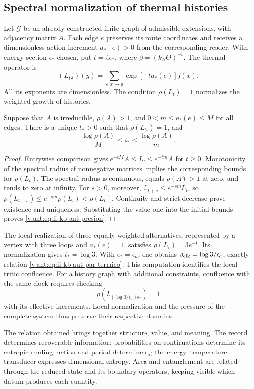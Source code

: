 \subsection{Spectral normalization of thermal histories}

Let \(\mathcal G\) be an already constructed finite graph of admissible
extensions, with adjacency matrix \(A\). Each edge \(e\) preserves
its route coordinates and receives a dimensionless action increment
\(a_*(e)>0\) from the corresponding reader. With energy section
\(\epsilon_*\) chosen, put \(t=\beta\epsilon_*\), where
\(\beta=(k_B\Theta)^{-1}\). The thermal operator is
\begin{equation}
 (L_tf)(y)=\sum_{e:x\to y}\exp[-t a_*(e)]f(x).
 \label{v:ant:eq:ii-kb-aut-operador}
\end{equation}
All its exponents are dimensionless. The condition
\(\rho(L_t)=1\) normalizes the weighted growth of histories.

\begin{proposition}
Suppose that \(A\) is irreducible, \(\rho(A)>1\), and
\(0<m\leq a_*(e)\leq M\) for all edges. There is a unique
\(t_*>0\) such that \(\rho(L_{t_*})=1\), and
\begin{equation}
 \frac{\log\rho(A)}{M}\leq t_*\leq
 \frac{\log\rho(A)}{m}.
 \label{v:ant:eq:ii-kb-aut-presion}
\end{equation}
\end{proposition}
\begin{proof}
Entrywise comparison gives
\(e^{-tM}A\leq L_t\leq e^{-tm}A\) for \(t\geq0\).
Monotonicity of the spectral radius of nonnegative matrices implies
the corresponding bounds for \(\rho(L_t)\). The spectral radius
is continuous, equals \(\rho(A)>1\) at zero, and tends to zero at infinity.
For \(s>0\), moreover,
\(L_{t+s}\leq e^{-sm}L_t\), so
\(\rho(L_{t+s})\leq e^{-sm}\rho(L_t)<\rho(L_t)\).
Continuity and strict decrease prove existence and
uniqueness. Substituting the value one into the initial bounds proves
\eqref{v:ant:eq:ii-kb-aut-presion}.
\end{proof}

The local realization of three equally weighted alternatives, represented
by a vertex with three loops and \(a_*(e)=1\), satisfies
\(\rho(L_t)=3e^{-t}\). Its normalization gives \(t_*=\log3\).
With \(\epsilon_*=\epsilon_a\), one obtains
\(\beta_{\rm clk}=\log3/\epsilon_a\), exactly relation
\eqref{v:ant:eq:ii-kb-aut-par-termico}. This computation identifies the
local tritic confluence. For a history graph with additional
constraints, confluence with the same clock requires checking
\[
 \rho\!\left(L_{(\log3/\epsilon_a)\epsilon_*}\right)=1
\]
with its effective increments. Local normalization and the pressure
of the complete system thus preserve their respective domains.

The relation obtained brings together structure, value, and meaning. The record
determines recoverable information; probabilities on
continuations determine its entropic reading; action and period
determine \(\epsilon_a\); the energy--temperature transducer
expresses dimensional entropy. Area and entanglement are
related through the reduced state and its boundary operators,
keeping visible which datum produces each quantity.
